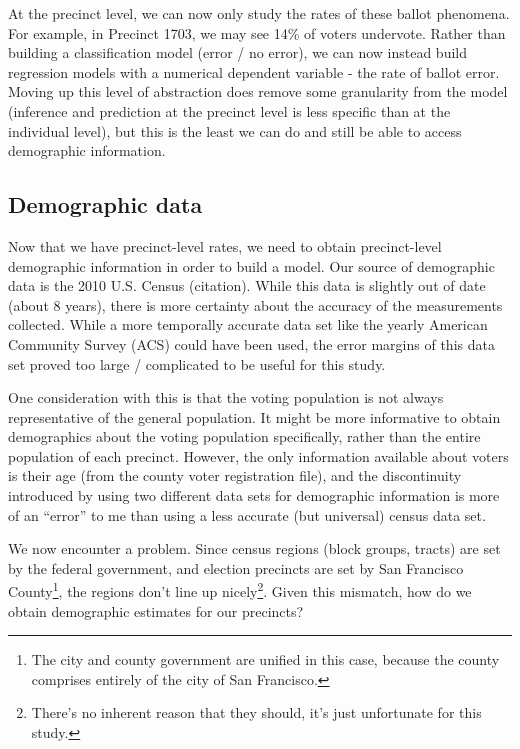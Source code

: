 \documentclass[12pt,twoside]{reedthesis}
\theoremstyle{definition}
\theoremstyle{definition}
\theoremstyle{definition}
\theoremstyle{remark}
\begin{document}
At the precinct level, we can now only study the rates of these ballot
phenomena. For example, in Precinct 1703, we may see 14\% of voters
undervote. Rather than building a classification model (error / no
error), we can now instead build regression models with a numerical
dependent variable - the rate of ballot error. Moving up this level of
abstraction does remove some granularity from the model (inference and
prediction at the precinct level is less specific than at the individual
level), but this is the least we can do and still be able to access
demographic information.

\hypertarget{demographic-data}{%
\subsection{Demographic data}\label{demographic-data}}

Now that we have precinct-level rates, we need to obtain precinct-level
demographic information in order to build a model. Our source of
demographic data is the 2010 U.S. Census (citation). While this data is
slightly out of date (about 8 years), there is more certainty about the
accuracy of the measurements collected. While a more temporally accurate
data set like the yearly American Community Survey (ACS) could have been
used, the error margins of this data set proved too large / complicated
to be useful for this study.

One consideration with this is that the voting population is not always
representative of the general population. It might be more informative
to obtain demographics about the voting population specifically, rather
than the entire population of each precinct. However, the only
information available about voters is their age (from the county voter
registration file), and the discontinuity introduced by using two
different data sets for demographic information is more of an ``error''
to me than using a less accurate (but universal) census data set.

We now encounter a problem. Since census regions (block groups, tracts)
are set by the federal government, and election precincts are set by San
Francisco County\footnote{The city and county government are unified in
  this case, because the county comprises entirely of the city of San
  Francisco.}, the regions don't line up nicely\footnote{There's no
  inherent reason that they should, it's just unfortunate for this
  study.}. Given this mismatch, how do we obtain demographic estimates
for our precincts?
\end{document}
